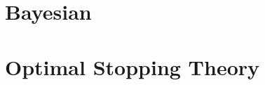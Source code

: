 \documentclass[11pt]{article}
\begin{document}
\section{Bayesian}



\section{Optimal Stopping Theory}



\newpage
\printbibliography[heading=bibintoc]

\end{document}
